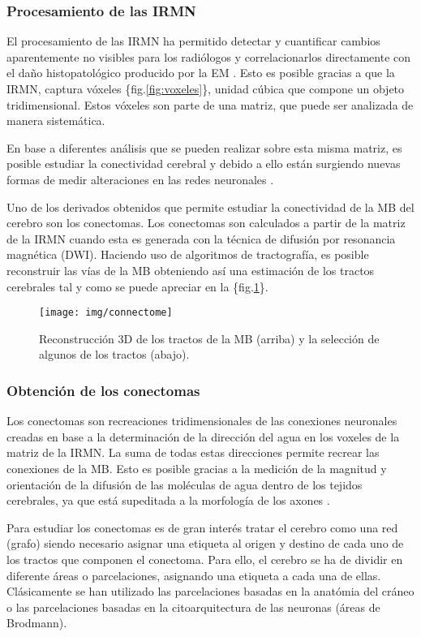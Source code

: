 \documentclass[fleqn,12pt]{UICArticle} %
\begin{document}
\subsubsection{Procesamiento de las IRMN}

El procesamiento de las IRMN ha permitido detectar y cuantificar cambios aparentemente no visibles para los radiólogos y correlacionarlos directamente con el daño histopatológico producido por la EM \cite{Beer2016, Nedjati-Gilani2017}. Esto es posible gracias a que la IRMN, captura vóxeles \{fig.\ref{fig:voxeles}\}, unidad cúbica que compone un objeto tridimensional. Estos vóxeles son parte de una matriz, que puede ser analizada de manera sistemática.
 
En base a diferentes análisis que se pueden realizar sobre esta misma matriz, es posible estudiar la conectividad cerebral y debido a ello están surgiendo nuevas formas de medir alteraciones en las redes neuronales \cite{Johansen2006}.


 Uno de los derivados obtenidos que permite estudiar la conectividad de la MB del cerebro son los conectomas. Los conectomas son calculados a partir de la matriz de la IRMN cuando esta es generada con la técnica de difusión por resonancia magnética (DWI). Haciendo uso de algoritmos de tractografía, es posible reconstruir las vías de la MB obteniendo así una estimación de los tractos cerebrales \cite{Mori2002} tal y como se puede apreciar en la \{fig.\ref{fig:connectome}\}.

\begin{figure}[h]
	\centering
	\texttt{[image: img/connectome]}
	\caption{Reconstrucción 3D de los tractos de la MB (arriba) y la selección de algunos de los tractos (abajo).}
	\label{fig:connectome}
\end{figure}


\subsubsection{Obtención de los conectomas}
Los conectomas son recreaciones tridimensionales de las conexiones neuronales creadas en base a la determinación de la dirección del agua en los voxeles de la matriz de la IRMN. La suma de todas estas direcciones permite recrear las conexiones de la MB. Esto es posible gracias a la medición de la magnitud y orientación de la difusión de las moléculas de agua dentro de los tejidos cerebrales, ya que está supeditada a la morfología de los axones \cite{Johansen2006}.

Para estudiar los conectomas es de gran interés tratar el cerebro como una red (grafo) \cite{Fornito, Bullmore2009} siendo necesario asignar una etiqueta al origen y destino de cada uno de los tractos que componen el conectoma. Para ello, el cerebro se ha de dividir en diferente áreas o parcelaciones, asignando una etiqueta a cada una de ellas. Clásicamente se han utilizado las parcelaciones basadas en la anatómia del cráneo o las parcelaciones basadas en la citoarquitectura de las neuronas (áreas de Brodmann).
\end{document}
